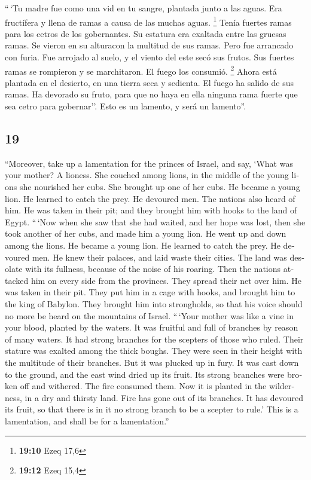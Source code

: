 \begin{paracol}{2}
 ``\,`Tu madre fue como una vid en tu sangre, plantada
junto a las aguas. Era fructífera y llena de ramas a causa de las muchas
aguas. \footnote{\textbf{19:10} Ezeq 17,6}  Tenía fuertes
ramas para los cetros de los gobernantes. Su estatura era exaltada entre
las gruesas ramas. Se vieron en su alturacon la multitud de sus ramas.
 Pero fue arrancado con furia. Fue arrojado al suelo, y
el viento del este secó sus frutos. Sus fuertes ramas se rompieron y se
marchitaron. El fuego los consumió. \footnote{\textbf{19:12} Ezeq 15,4}
 Ahora está plantada en el desierto, en una tierra seca y
sedienta.  El fuego ha salido de sus ramas. Ha devorado
su fruto, para que no haya en ella ninguna rama fuerte que sea cetro
para gobernar''. Esto es un lamento, y será un lamento''.

\switchcolumn
\begin{otherlanguage}{english}

\hypertarget{section-37}{%
\section{19}\label{section-37}}

 ``Moreover, take up a lamentation for the princes of
Israel,  and say, `What was your mother? A lioness. She
couched among lions, in the middle of the young lions she nourished her
cubs.  She brought up one of her cubs. He became a young
lion. He learned to catch the prey. He devoured men.  The
nations also heard of him. He was taken in their pit; and they brought
him with hooks to the land of Egypt.  ``\,`Now when she
saw that she had waited, and her hope was lost, then she took another of
her cubs, and made him a young lion.  He went up and down
among the lions. He became a young lion. He learned to catch the prey.
He devoured men.  He knew their palaces, and laid waste
their cities. The land was desolate with its fullness, because of the
noise of his roaring.  Then the nations attacked him on
every side from the provinces. They spread their net over him. He was
taken in their pit.  They put him in a cage with hooks,
and brought him to the king of Babylon. They brought him into
strongholds, so that his voice should no more be heard on the mountains
of Israel.  ``\,`Your mother was like a vine in your
blood, planted by the waters. It was fruitful and full of branches by
reason of many waters.  It had strong branches for the
scepters of those who ruled. Their stature was exalted among the thick
boughs. They were seen in their height with the multitude of their
branches.  But it was plucked up in fury. It was cast
down to the ground, and the east wind dried up its fruit. Its strong
branches were broken off and withered. The fire consumed them.
 Now it is planted in the wilderness, in a dry and
thirsty land.  Fire has gone out of its branches. It has
devoured its fruit, so that there is in it no strong branch to be a
scepter to rule.' This is a lamentation, and shall be for a
lamentation.''


\end{otherlanguage}
\end{paracol}
